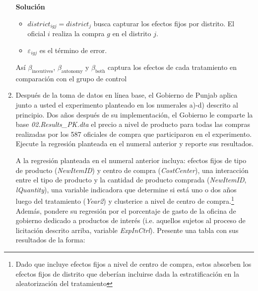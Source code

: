 \documentclass[a4paper, answers, addpoints, 11pt]{exam}
\newenvironment{solucion}{%
  \begin{mdframed}[
    backgroundcolor=blue!5,    %
    linecolor=blue!50,          %
    linewidth=2pt,              %
    leftmargin=10pt,            %
    rightmargin=10pt,           %
    topline=true,              %
    bottomline=true,            %
    roundcorner=10pt,           %
    innerleftmargin=10pt,       %
    innerrightmargin=10pt,      %
    innerbottommargin=10pt,     %
    innertopmargin=10pt         %
  ]%
  \begin{tcolorbox}[colframe=blue!50!black, colback=blue!50, coltitle=white, sharp corners=all, boxrule=1mm, width=\textwidth, halign=left, valign=center, top=0mm, bottom=0mm, left=0mm, right=0mm] \textbf{Solución} \end{tcolorbox} }{\end{mdframed}}
\begin{document}
\begin{enumerate}
\begin{solucion}
\begin{itemize}
    \item \( district_{igj} = district_{j} \) busca capturar los efectos fijos por distrito. El oficial \( i \) realiza la compra \( g \) en el distrito \( j \).
    \item \( \varepsilon_{igj} \) es el término de error.
\end{itemize}
Así \( \beta_{\text{incentives}} \), \( \beta_{\text{autonomy}} \) y \( \beta_{\text{both}} \) captura los efectos de cada tratamiento en comparación con el grupo de control
   \end{solucion}


   \item Después de la toma de datos en línea base, el Gobierno de Punjab aplica junto a usted el experimento planteado en los numerales a)-d) descrito al principio. Dos años después de su implementación, el Gobierno le comparte la base \textit{02.Results\_PK.dta} el precio a nivel de producto para todas las compras realizadas por los 587 oficiales de compra que participaron en el experimento. Ejecute la regresión planteada en el numeral anterior y reporte sus resultados.
   
   \bigbreak A la regresión planteada en el numeral anterior incluya: efectos fijos de tipo de producto (\textit{NewItemID}) y centro de compra (\textit{CostCenter}), una interacción entre el tipo de producto y la cantidad de producto comprada (\textit{NewItemID}, \textit{lQuantity}), una variable indicadora que determine si está uno o dos años luego del tratamiento (\textit{Year2}) y clusterice a nivel de centro de compra.\footnote{\footnotesize{Dado que incluye efectos fijos a nivel de centro de compra, estos absorben los efectos fijos de distrito que deberían incluirse dada la estratificación en la aleatorización del tratamiento}} Además, pondere su regresión por el porcentaje de gasto de la oficina de gobierno dedicado a productos de interés (i.e. aquellos sujetos al proceso de licitación descrito arriba, variable \textit{ExpInCtrl}). Presente una tabla con sus resultados de la forma:


\end{enumerate}
\end{document}

